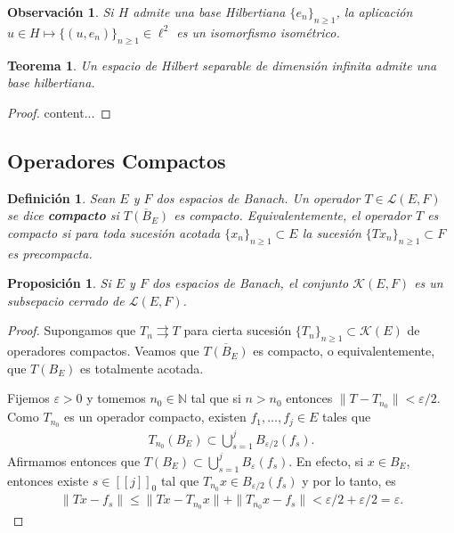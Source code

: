 \documentclass[11pt]{report}
\theoremstyle{colored}
\newtheorem{definition}{Definición}[section]
\newtheorem{theorem}{Teorema}[section]
\newtheorem{proposition}{Proposición}[section]
\newtheorem{remark}{Observación}[section]
\newcommand{\N}{\mathbb{N}}
\newcommand{\eps}{\varepsilon}
\newcommand{\nat}[1]{[\![#1]\!]}
\newcommand{\natzero}[1]{\nat{#1}_0}
\begin{document}
\begin{remark} Si $H$ admite una base Hilbertiana $\{e_n\}_{n \geq 1}$, la aplicación $u \in H \mapsto \{(u,e_n)\}_{n \geq 1} \in \ell^2$ es un isomorfismo isométrico.
\end{remark}

\begin{theorem} Un espacio de Hilbert separable de dimensión infinita admite una base hilbertiana.
\end{theorem}
\begin{proof}
content...
\end{proof}

\subsection{Operadores Compactos}

\begin{definition} Sean $E$ y $F$ dos espacios de Banach. Un operador $T \in \mathscr{L}(E,F)$ se dice \textbf{compacto} si $\overline{T(B_E)}$ es compacto. Equivalentemente, el operador $T$ es compacto si para toda sucesión acotada $\{x_n\}_{n \geq 1} \subset E$ la sucesión $\{Tx_n\}_{n \geq 1} \subset F$ es precompacta.
\end{definition}

\begin{proposition} Si $E$ y $F$ dos espacios de Banach, el conjunto $\mathscr{K}(E,F)$ es un subsepacio cerrado de $\mathscr{L}(E,F)$.
\end{proposition}
\begin{proof} Supongamos que $T_{n} \rightrightarrows T$ para cierta sucesión $\{T_n\}_{n \geq 1} \subset \mathscr{K}(E)$ de operadores compactos. Veamos que $\overline{T(B_E)}$ es compacto, o equivalentemente, que $T(B_E)$ es totalmente acotada.

Fijemos $\eps > 0$ y tomemos $n_0 \in \N$ tal que si $n > n_0$ entonces $\|T-T_{n_0}\| < \eps/2$. Como $T_{n_0}$ es un operador compacto, existen $f_1, \dots, f_j \in E$ tales que
\begin{align*}
T_{n_0}(B_E) \subset \bigcup_{s=1}^{j}B_{\eps/2}(f_s).
\end{align*}
Afirmamos entonces que $T(B_E) \subset \bigcup_{s=1}^{j}B_{\eps}(f_s)$. En efecto, si $x \in B_E$, entonces existe $s \in \natzero{j}$ tal que $T_{n_0}x \in B_{\eps/2}(f_s)$ y por lo tanto, es
\begin{align*}
\|Tx-f_s\| \leq \|Tx-T_{n_0}x\| + \|T_{n_0}x - f_s\| < \eps/2 + \eps/2 = \eps.
\end{align*}
\end{proof}
\end{document}
